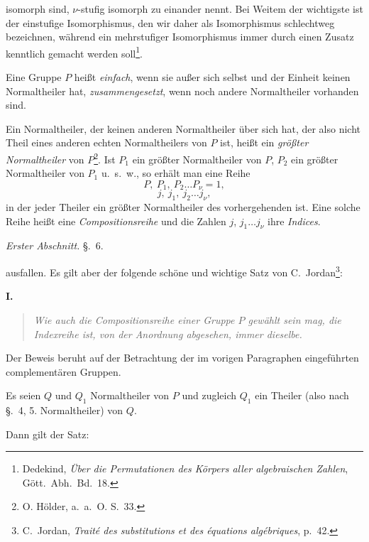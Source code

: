 \documentclass[12pt,a4paper]{book}
\begin{document}
isomorph sind, $\nu$-stufig isomorph zu einander nennt. Bei Weitem der wichtigste ist der einstufige Isomorphismus, den wir daher als Isomorphismus schlechtweg bezeichnen, w\"ahrend ein mehrstufiger Isomorphismus immer durch einen Zusatz kenntlich gemacht werden soll\footnote{Dedekind, \textit{\"Uber die Permutationen des K\"orpers aller algebraischen Zahlen}, G\"ott.\ Abh.\ Bd.~18.}.

Eine Gruppe $P$ hei\ss t \textit{einfach}, wenn sie au\ss er sich selbst und der Einheit keinen Normaltheiler hat, \textit{zusammengesetzt}, wenn noch andere Normaltheiler vorhanden sind.

Ein Normaltheiler, der keinen anderen Normaltheiler \"uber sich hat, der also nicht Theil eines anderen echten Normaltheilers von $P$ ist, hei\ss t ein \textit{gr\"o\ss ter Normaltheiler} von $P$\footnote{O. H\"older, a.\ a.\ O. S.~33.}. Ist $P_1$ ein gr\"o\ss ter Normaltheiler von $P$, $P_2$ ein gr\"o\ss ter Normaltheiler von $P_1$ u.~s.~w., so erh\"alt man eine Reihe
\[P,\ P_1,\ P_2 \ldots P_\nu = 1,\]
\[j,\ j_1,\ j_2 \ldots j_\nu,\]
in der jeder Theiler ein gr\"o\ss ter Normaltheiler des vorhergehenden ist. Eine solche Reihe hei\ss t eine \textit{Compositionsreihe} und die Zahlen $j$, $j_1 \ldots j_\nu$ ihre \textit{Indices}.

\newpage
{} \hfill \textit{Erster Abschnitt.} \hfill \S.~6.

\vspace{0.3cm}

ausfallen. Es gilt aber der folgende sch\"one und wichtige Satz von C.~Jordan\footnote{C.~Jordan, \textit{Trait\'e des substitutions et des \'equations alg\'ebriques}, p.~42.}:

\begin{center}
\textbf{I.}
\end{center}

\vspace{-0.2cm}
\begin{quote}
\textit{Wie auch die Compositionsreihe einer Gruppe $P$ gew\"ahlt sein mag, die Indexreihe ist, von der Anordnung abgesehen, immer dieselbe.}
\end{quote}

Der Beweis beruht auf der Betrachtung der im vorigen Paragraphen eingef\"uhrten complement\"aren Gruppen.

Es seien $Q$ und $Q_1$ Normaltheiler von $P$ und zugleich $Q_1$ ein Theiler (also nach \S.~4, 5. Normaltheiler) von $Q$.

Dann gilt der Satz:
\end{document}
